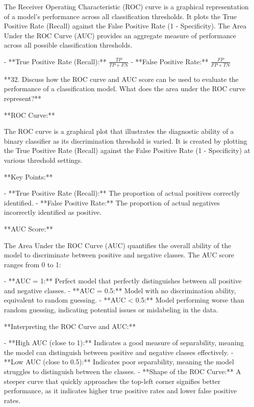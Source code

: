 The Receiver Operating Characteristic (ROC) curve is a graphical representation of a model's performance across all classification thresholds. It plots the True Positive Rate (Recall) against the False Positive Rate (1 - Specificity). The Area Under the ROC Curve (AUC) provides an aggregate measure of performance across all possible classification thresholds.

- **True Positive Rate (Recall):** \( \frac{TP}{TP + FN} \)
- **False Positive Rate:** \( \frac{FP}{FP + TN} \)

 **32. Discuss how the ROC curve and AUC score can be used to evaluate the performance of a classification model. What does the area under the ROC curve represent?**

**ROC Curve:**

The ROC curve is a graphical plot that illustrates the diagnostic ability of a binary classifier as its discrimination threshold is varied. It is created by plotting the True Positive Rate (Recall) against the False Positive Rate (1 - Specificity) at various threshold settings.

**Key Points:**

- **True Positive Rate (Recall):** The proportion of actual positives correctly identified.
- **False Positive Rate:** The proportion of actual negatives incorrectly identified as positive.

**AUC Score:**

The Area Under the ROC Curve (AUC) quantifies the overall ability of the model to discriminate between positive and negative classes. The AUC score ranges from 0 to 1:

- **AUC = 1:** Perfect model that perfectly distinguishes between all positive and negative classes.
- **AUC = 0.5:** Model with no discrimination ability, equivalent to random guessing.
- **AUC < 0.5:** Model performing worse than random guessing, indicating potential issues or mislabeling in the data.

**Interpreting the ROC Curve and AUC:**

- **High AUC (close to 1):** Indicates a good measure of separability, meaning the model can distinguish between positive and negative classes effectively.
- **Low AUC (close to 0.5):** Indicates poor separability, meaning the model struggles to distinguish between the classes.
- **Shape of the ROC Curve:** A steeper curve that quickly approaches the top-left corner signifies better performance, as it indicates higher true positive rates and lower false positive rates.


